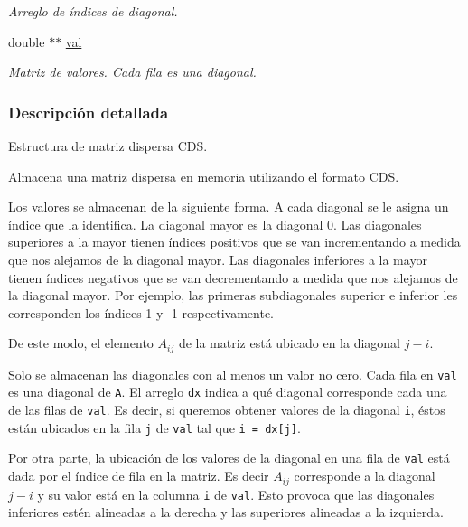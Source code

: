 \begin{CompactItemize}
\begin{CompactList}\small\item\em Arreglo de índices de diagonal. \item\end{CompactList}\item 
\hypertarget{structsp__cds_4a43be75b65bb01b343c8d3c144b7194}{
double $\ast$$\ast$ \hyperlink{structsp__cds_4a43be75b65bb01b343c8d3c144b7194}{val}}
\label{structsp__cds_4a43be75b65bb01b343c8d3c144b7194}

\begin{CompactList}\small\item\em Matriz de valores. Cada fila es una diagonal. \item\end{CompactList}\end{CompactItemize}


\subsubsection{Descripción detallada}
Estructura de matriz dispersa CDS. 

Almacena una matriz dispersa en memoria utilizando el formato CDS.

Los valores se almacenan de la siguiente forma. A cada diagonal se le asigna un índice que la identifica. La diagonal mayor es la diagonal 0. Las diagonales superiores a la mayor tienen índices positivos que se van incrementando a medida que nos alejamos de la diagonal mayor. Las diagonales inferiores a la mayor tienen índices negativos que se van decrementando a medida que nos alejamos de la diagonal mayor. Por ejemplo, las primeras subdiagonales superior e inferior les corresponden los índices 1 y -1 respectivamente.

De este modo, el elemento $A_{ij}$ de la matriz está ubicado en la diagonal $j-i$.

Solo se almacenan las diagonales con al menos un valor no cero. Cada fila en {\tt val} es una diagonal de {\tt A}. El arreglo {\tt dx} indica a qué diagonal corresponde cada una de las filas de {\tt val}. Es decir, si queremos obtener valores de la diagonal {\tt i}, éstos están ubicados en la fila {\tt j} de {\tt val} tal que {\tt i = dx\mbox{[}j\mbox{]}}.

Por otra parte, la ubicación de los valores de la diagonal en una fila de {\tt val} está dada por el índice de fila en la matriz. Es decir $A_{ij}$ corresponde a la diagonal $j-i$ y su valor está en la columna {\tt i} de {\tt val}. Esto provoca que las diagonales inferiores estén alineadas a la derecha y las superiores alineadas a la izquierda.

